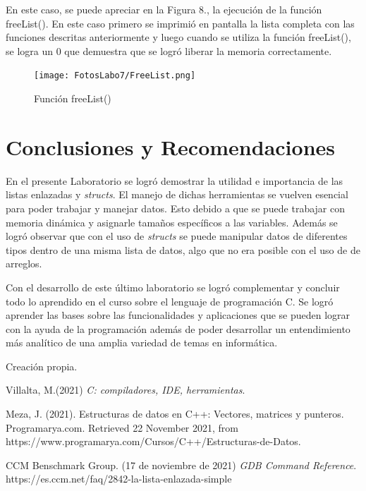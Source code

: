 \documentclass[12pt,a4paper]{article}
\begin{document}
En este caso, se puede apreciar en la Figura 8., la ejecución de la función freeList(). En este caso primero se imprimió en pantalla la lista completa con las funciones descritas anteriormente y luego cuando se utiliza la función freeList(), se logra un 0 que demuestra que se logró liberar la memoria correctamente.

\begin{figure}[H]
    \centering
    \center
    \texttt{[image: FotosLabo7/FreeList.png]}
    \caption{Función freeList() \cite{cap}}
    \label{fig:push_front}
\end{figure}

\vspace{8mm}
\section{Conclusiones y Recomendaciones}

En el presente Laboratorio se logró demostrar la utilidad e importancia de las listas enlazadas y \textit{structs}. El manejo de dichas herramientas se vuelven esencial para poder trabajar y manejar datos. Esto debido a que se puede trabajar con memoria dinámica y asignarle tamaños específicos a las variables. Además se logró observar que con el uso de \textit{structs} se puede manipular datos de diferentes tipos dentro de una misma lista de datos, algo que no era posible con el uso de de arreglos.

Con el desarrollo de este último laboratorio se logró complementar y concluir todo lo aprendido en el curso sobre el lenguaje de programación C. Se logró aprender las bases sobre las funcionalidades y aplicaciones que se pueden lograr con la ayuda de la programación además de poder desarrollar un entendimiento más analítico de una amplia variedad de temas en informática.  



\begin{thebibliography}{}
Creación propia.

Villalta, M.(2021) \textit{C: compiladores, IDE, herramientas}.  

Meza, J. (2021). Estructuras de datos en C++: Vectores, matrices y punteros. Programarya.com. Retrieved 22 November 2021, from https://www.programarya.com/Cursos/C++/Estructuras-de-Datos.

CCM Benschmark Group. (17 de noviembre de 2021) \textit{GDB Command Reference}. https://es.ccm.net/faq/2842-la-lista-enlazada-simple


\end{thebibliography}

\end{document}
